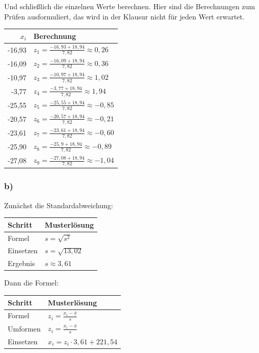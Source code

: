 \documentclass[
  11pt,
  ngerman,
  a4paper,
]{report}
\begin{document}
Und schließlich die einzelnen Werte berechnen. Hier sind die Berechnungen zum Prüfen ausformuliert, das wird in der Klausur nicht für jeden Wert erwartet.

\begin{table}[H]
\centering
\begin{tabular}{rl}
\toprule
\textbf{$x_i$} & \textbf{Berechnung}\\
\midrule
-16,93 & $z_{1}=\frac{-16{,}93+18{,}94}{7{,}82}\approx0{,}26$\\
-16,09 & $z_{2}=\frac{-16{,}09+18{,}94}{7{,}82}\approx0{,}36$\\
-10,97 & $z_{3}=\frac{-10{,}97+18{,}94}{7{,}82}\approx1{,}02$\\
-3,77 & $z_{4}=\frac{-3{,}77+18{,}94}{7{,}82}\approx1{,}94$\\
-25,55 & $z_{5}=\frac{-25{,}55+18{,}94}{7{,}82}\approx-0{,}85$\\
-20,57 & $z_{6}=\frac{-20{,}57+18{,}94}{7{,}82}\approx-0{,}21$\\
-23,61 & $z_{7}=\frac{-23{,}61+18{,}94}{7{,}82}\approx-0{,}60$\\
-25,90 & $z_{8}=\frac{-25{,}9+18{,}94}{7{,}82}\approx-0{,}89$\\
-27,08 & $z_{9}=\frac{-27{,}08+18{,}94}{7{,}82}\approx-1{,}04$\\
\bottomrule
\end{tabular}
\end{table}

\hypertarget{b-8}{%
\subsubsection{b)}\label{b-8}}

Zunächst die Standardabweichung:

\begin{table}[H]
\centering
\begin{tabular}{ll}
\toprule
\textbf{Schritt} & \textbf{Musterlösung}\\
\midrule
Formel & $s=\sqrt{s^2}$\\
Einsetzen & $s=\sqrt{13{,}02}$\\
Ergebnis & $s\approx3{,}61$\\
\bottomrule
\end{tabular}
\end{table}

Dann die Formel:

\begin{table}[H]
\centering
\begin{tabular}{ll}
\toprule
\textbf{Schritt} & \textbf{Musterlösung}\\
\midrule
Formel & $z_{i} = \frac{x_{i} - \bar{x}}{s}$\\
Umformen & $z_{i} = \frac{x_{i} - \bar{x}}{s}$\\
Einsetzen & $x_{i} = z_{i} \cdot 3{,}61 + 221{,}54$\\
\bottomrule
\end{tabular}
\end{table}
\end{document}
